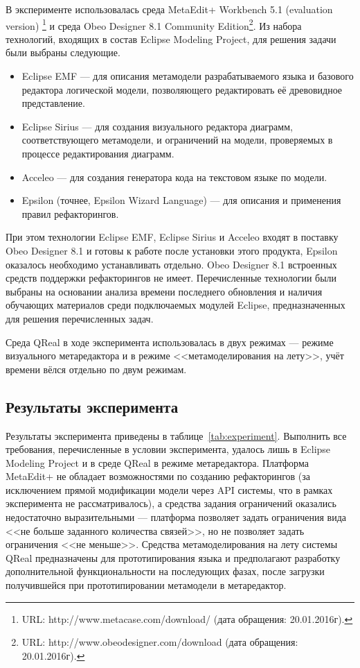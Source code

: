 В эксперименте использовалась среда MetaEdit+ Workbench 5.1 (evaluation version)%
\footnote{URL: http://www.metacase.com/download/ (дата обращения: 20.01.2016г).}
и среда Obeo Designer 8.1 Community Edition\footnote{URL: http://www.obeodesigner.com/download (дата обращения: 20.01.2016г).}.
Из набора технологий, входящих в состав Eclipse Modeling Project, для решения задачи были выбраны
следующие.
\begin{itemize}
	\item Eclipse EMF --- для описания метамодели разрабатываемого языка и базового редактора
		логической модели, позволяющего редактировать её древовидное представление.
	\item Eclipse Sirius --- для создания визуального редактора диаграмм, соответствующего
		метамодели, и ограничений на модели, проверяемых в процессе редактирования диаграмм.
	\item Acceleo --- для создания генератора кода на текстовом языке по модели.
	\item Epsilon (точнее, Epsilon Wizard Language) --- для описания и применения правил рефакторингов.
\end{itemize}

При этом технологии Eclipse EMF, Eclipse Sirius и Acceleo входят в поставку Obeo Designer 8.1
и готовы к работе после установки этого продукта, Epsilon оказалось необходимо устанавливать
отдельно. Obeo Designer 8.1 встроенных средств поддержки рефакторингов не имеет.
Перечисленные технологии были выбраны на основании анализа времени последнего обновления
и наличия обучающих материалов среди подключаемых модулей Eclipse, предназначенных для решения
перечисленных задач.

Среда QReal в ходе эксперимента использовалась в двух режимах --- режиме визуального метаредактора
и в режиме <<метамоделирования на лету>>, учёт времени вёлся отдельно по двум режимам.

\subsection{Результаты эксперимента}
Результаты эксперимента приведены в таблице~\ref{tab:experiment}. Выполнить все требования,
перечисленные в условии эксперимента, удалось лишь в Eclipse Modeling Project и в
среде QReal в режиме метаредактора. Платформа MetaEdit+ не обладает возможностями по созданию
рефакторингов (за исключением прямой модификации модели через \ac{API} системы,
что в рамках эксперимента не рассматривалось), а средства задания ограничений оказались
недостаточно выразительными --- платформа позволяет задать ограничения вида <<не больше
заданного количества связей>>, но не позволяет задать ограничения <<не меньше>>.
Средства метамоделирования на лету системы QReal предназначены для прототипирования
языка и предполагают разработку дополнительной функциональности на последующих фазах,
после загрузки получившейся при прототипировании метамодели в метаредактор. 

